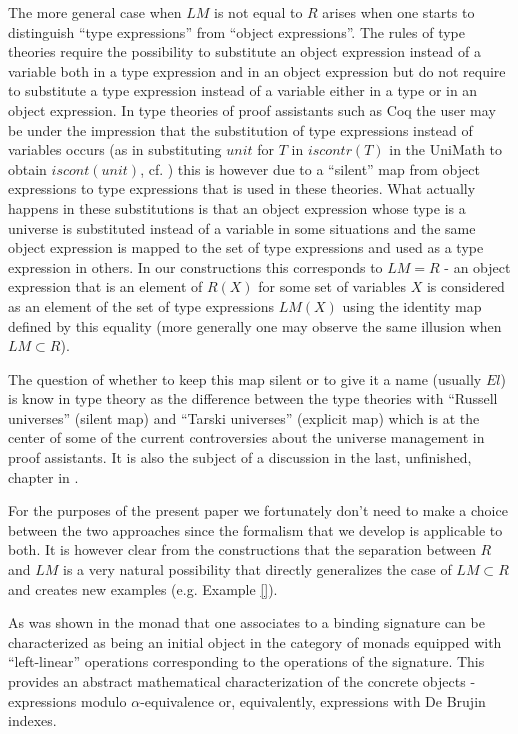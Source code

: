 \documentclass[11pt]{article}
\begin{document}
The more general case when $LM$ is not equal to $R$ arises when one starts to distinguish ``type expressions'' from ``object expressions''. The rules of type theories require the possibility to substitute an object expression instead of a variable both in a type expression and in an object expression but do not require to substitute a type expression instead of a variable either in a type or in an object expression. In type theories of proof assistants such as Coq the user may be under the impression that the substitution of type expressions instead of variables occurs (as in substituting $unit$ for $T$ in $iscontr(T)$ in the UniMath to obtain $iscont(unit)$, cf. \cite{UniMath2015}) this is however due to a ``silent'' map from object expressions to type expressions that is used in these theories. What actually happens in these substitutions is that an object expression whose type is a universe is substituted instead of a variable in some situations and the same object expression is mapped to the set of type expressions and used as a type expression in others. In our constructions this corresponds to $LM=R$ - an object expression that is an element of $R(X)$ for some set of variables $X$ is considered as an element of the set of type expressions $LM(X)$ using the identity map defined by this equality (more generally one may observe the same illusion when $LM\subset R$). 

The question of whether to keep this map silent or to give it a name (usually $El$) is know in type theory as the difference between the type theories with ``Russell universes'' (silent map) and ``Tarski universes'' (explicit map) which is at the center of some of the current controversies about the universe management in proof assistants. It is also the subject of a discussion in the last, unfinished, chapter in \cite{Bibliopolis}. 

For the purposes of the present paper we fortunately don't need to make a choice between the two approaches since the formalism that we develop is applicable to both. It is however clear from the constructions that the separation between $R$ and $LM$ is a very natural possibility that directly generalizes the case of $LM\subset R$ and creates new examples (e.g. Example \ref{}). 

As was shown in \cite{HM2007} the monad that one associates to a binding signature can be characterized as being an initial object in the category of monads equipped with ``left-linear'' operations corresponding to the operations of the signature.  This provides an abstract mathematical characterization of the concrete objects - expressions modulo $\alpha$-equivalence or, equivalently, expressions with De Brujin indexes. 
\end{document}
